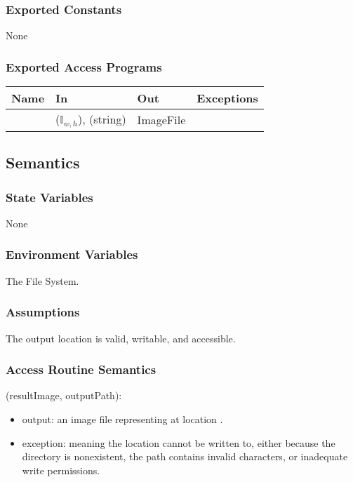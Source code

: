 \documentclass[12pt, titlepage]{article}
\begin{document}
\subsubsection{Exported Constants}
None

\subsubsection{Exported Access Programs}

\begin{center}
\begin{tabular}{L{2cm} L{4cm} L{4cm} L{2cm}}
\hline
\textbf{Name} & \textbf{In} & \textbf{Out} & \textbf{Exceptions} \\
\hline
{} &  ($\mathbb{I}_{w,h}$),  (string) & ImageFile &  \\
\hline
\end{tabular}
\end{center}

\subsection{Semantics}

\subsubsection{State Variables}
None

\subsubsection{Environment Variables}
The File System.

\subsubsection{Assumptions}
The output location is valid, writable, and accessible.

\subsubsection{Access Routine Semantics}

\noindent {}(resultImage, outputPath):
\begin{itemize}
\item output: an image file representing  at location . 
\item exception:  meaning the location cannot be written to, either because
  the directory is nonexistent, the path contains invalid characters, or inadequate write permissions.
\end{itemize}
\end{document}
